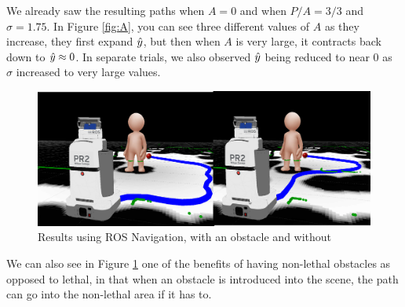 We already saw the resulting paths when $A=0$ and when $P/A = 3/3$ and $\sigma=1.75$. In Figure \ref{fig:A}, you can see three different values of $A$ as they increase, they first expand $\hat{y}$, but then when $A$ is very large, it contracts back down to $\hat{y}\approx0$. In separate trials, we also observed $\hat{y}$ being reduced to near 0 as $\sigma$ increased to very large values. 


\begin{figure}[b]
\centering
\includegraphics[width=.8\textwidth]{graphix/obstacle.png}
\caption{Results using ROS Navigation, with an obstacle and without}
\label{fig:o}
\end{figure}

We can also see in Figure \ref{fig:o} one of the benefits of having non-lethal obstacles as opposed to lethal, in that when an obstacle is introduced into the scene, the path can go into the non-lethal area if it has to. 


